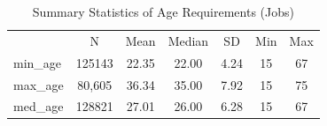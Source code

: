 \begin{table}[htbp]\centering
\def\sym#1{\ifmmode^{#1}\else\(^{#1}\)\fi}
\caption{Summary Statistics of Age Requirements (Jobs)}
\begin{tabular}{l*{1}{cccccc}}
\toprule
                    &           N&        Mean&      Median&          SD&         Min&         Max\\
\label{tab:company_age}
min\_age             &      125143&       22.35&       22.00&        4.24&          15&          67\\
max\_age             &      80,605&       36.34&       35.00&        7.92&          15&          75\\
med\_age             &      128821&       27.01&       26.00&        6.28&          15&          67\\
\bottomrule
\end{tabular}
\end{table}
